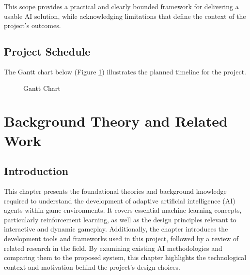 \documentclass[12pt,oneside,openright,a4paper]{cpe-english-project}
\begin{document}
This scope provides a practical and clearly bounded framework for delivering a usable AI solution, while acknowledging limitations that define the context of the project's outcomes.

\section{Project Schedule}
The Gantt chart below (Figure \ref{fig:Gantt Chart}) illustrates the planned timeline for the project.
\begin{figure}[H]
\centering
{}
\caption{Gantt Chart}\label{fig:Gantt Chart}
\end{figure}
\chapter{Background Theory and Related Work}
\section{Introduction}
This chapter presents the foundational theories and background knowledge required to understand the development of adaptive artificial intelligence (AI) agents within game environments. It covers essential machine learning concepts, particularly reinforcement learning, as well as the design principles relevant to interactive and dynamic gameplay. Additionally, the chapter introduces the development tools and frameworks used in this project, followed by a review of related research in the field. By examining existing AI methodologies and comparing them to the proposed system, this chapter highlights the technological context and motivation behind the project's design choices.
\end{document}
